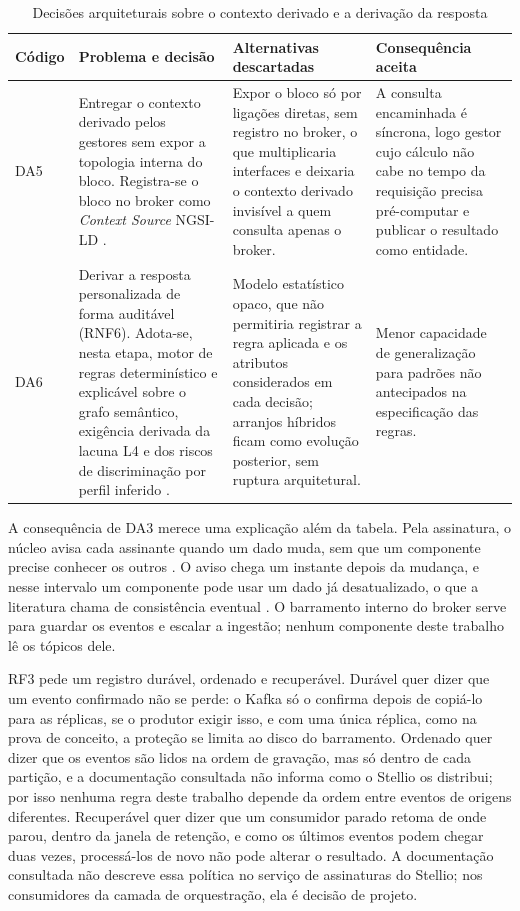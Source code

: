 \begin{table}[H]
\centering
\caption{Decisões arquiteturais sobre o contexto derivado e a derivação da resposta}
\label{tab:adr2}
\scriptsize
\begin{tabularx}{\textwidth}{@{}l>{\raggedright\arraybackslash}p{3.1cm}XX@{}}
\toprule
\textbf{Código} & \textbf{Problema e decisão} & \textbf{Alternativas descartadas} & \textbf{Consequência aceita} \\
\midrule
DA5 & Entregar o contexto derivado pelos gestores sem expor a topologia interna do bloco. Registra-se o bloco no broker como \textit{Context Source} NGSI-LD \cite{etsi2024ngsild}. & Expor o bloco só por ligações diretas, sem registro no broker, o que multiplicaria interfaces e deixaria o contexto derivado invisível a quem consulta apenas o broker. & A consulta encaminhada é síncrona, logo gestor cujo cálculo não cabe no tempo da requisição precisa pré-computar e publicar o resultado como entidade. \\
\addlinespace
DA6 & Derivar a resposta personalizada de forma auditável (RNF6). Adota-se, nesta etapa, motor de regras determinístico e explicável sobre o grafo semântico, exigência derivada da lacuna L4 e dos riscos de discriminação por perfil inferido \cite{fontes2024human}. & Modelo estatístico opaco, que não permitiria registrar a regra aplicada e os atributos considerados em cada decisão; arranjos híbridos \cite{lex2025hybrid} ficam como evolução posterior, sem ruptura arquitetural. & Menor capacidade de generalização para padrões não antecipados na especificação das regras. \\
\bottomrule
\end{tabularx}
\end{table}

A consequência de DA3 merece uma explicação além da tabela. Pela assinatura, o núcleo avisa cada assinante quando um dado muda, sem que um componente precise conhecer os outros \cite{eugster2003many}. O aviso chega um instante depois da mudança, e nesse intervalo um componente pode usar um dado já desatualizado, o que a literatura chama de consistência eventual \cite{kleppmann2017designing}. O barramento interno do broker serve para guardar os eventos e escalar a ingestão; nenhum componente deste trabalho lê os tópicos dele.

RF3 pede um registro durável, ordenado e recuperável. Durável quer dizer que um evento confirmado não se perde: o Kafka só o confirma depois de copiá-lo para as réplicas, se o produtor exigir isso, e com uma única réplica, como na prova de conceito, a proteção se limita ao disco do barramento. Ordenado quer dizer que os eventos são lidos na ordem de gravação, mas só dentro de cada partição, e a documentação consultada não informa como o Stellio os distribui; por isso nenhuma regra deste trabalho depende da ordem entre eventos de origens diferentes. Recuperável quer dizer que um consumidor parado retoma de onde parou, dentro da janela de retenção, e como os últimos eventos podem chegar duas vezes, processá-los de novo não pode alterar o resultado. A documentação consultada não descreve essa política no serviço de assinaturas do Stellio; nos consumidores da camada de orquestração, ela é decisão de projeto.

